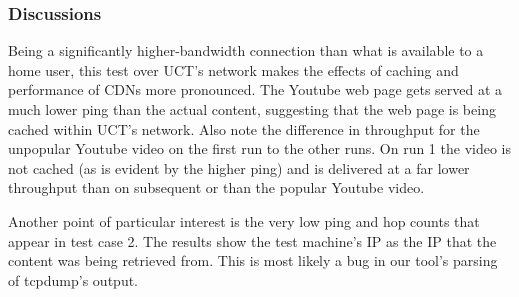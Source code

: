 \documentclass{sig-alternate-05-2015}
\begin{document}
\begin{table}
	\centering
	\caption{Throughput using UCT network - Test 2}
	\label{table:UCTThroughput-TestCase2}
\end{table}

\subsubsection{Discussions}
Being a significantly higher-bandwidth connection than what is available to a home user, this test over UCT's network makes the effects of caching and performance of CDNs more pronounced. The Youtube web page  gets served at a much lower ping than the actual content, suggesting that the web page is being cached within UCT's network. Also note the difference in throughput for the unpopular Youtube video on the first run to the other runs. On run 1 the video is not cached (as is evident by the higher ping) and is delivered at a far lower throughput than on subsequent or than the popular Youtube video.

Another point of particular interest is the very low ping and hop counts that appear in test case 2. The results show the test machine's IP as the IP that the content was being retrieved from. This is most likely a bug in our tool's parsing of tcpdump's output.
\end{document}
